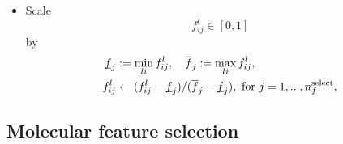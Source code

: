 \documentclass[12pt]{article}
\begin{document}
\begin{itemize}
	\item Scale
	\begin{equation}
		\label{eq:scale_1}
		f^l_{ij} \in [0, 1]
	\end{equation}
	by
	\begin{equation}
		\label{eq:scale_2}
		\begin{split}
			\underbar{$f$}_j &:= \min_{li} f^l_{ij}, ~~~ \overline{f}_j := \max_{li} f^l_{ij}, \\
			f^l_{ij} &\leftarrow (f^l_{ij} - \underbar{$f$}_j)/ (\overline{f}_j - \underbar{$f$}_j), \text{ for } j = 1,..., n_f^\text{select},
		\end{split}
	\end{equation}
\end{itemize}
	
\subsection{Molecular feature selection}
\end{document}
